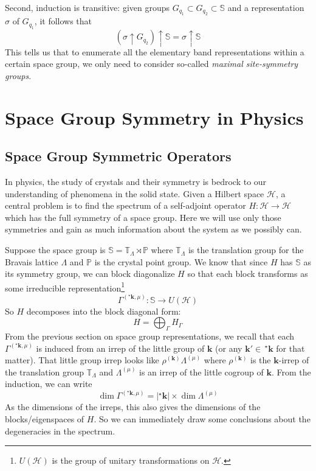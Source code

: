 \documentclass[9 pt]{report}
\def\*#1{\boldsymbol{#1}}
\begin{document}
Second, induction is transitive: given groups $G_{q_1}\subset G_{q_2} \subset \mathbb{S}$ and a representation $\sigma$ of $G_{q_1}$, it follows that
$$ (\sigma \uparrow G_{q_2})\uparrow \mathbb{S} = \sigma \uparrow \mathbb{S}$$
This tells us that to enumerate all the elementary band representations within a certain space group, we only need to consider so-called \emph{maximal site-symmetry groups}.


\chapter*{Space Group Symmetry in Physics}

{\centering
\section*{Space Group Symmetric Operators}}

\noindent In physics, the study of crystals and their symmetry is bedrock to our understanding of phenomena in the solid state. Given a Hilbert space $\mathcal{H}$, a central problem is to find the spectrum of a self-adjoint operator $H:\mathcal{H}\to\mathcal{H}$ which has the full symmetry of a space group. Here we will use only those symmetries and gain as much information about the system as we possibly can.

Suppose the space group is $\mathbb{S}=\mathbb{T}_\Lambda\rtimes\mathbb{P}$ where $\mathbb{T}_\Lambda$ is the translation group for the Bravais lattice $\Lambda$ and $\mathbb{P}$ is the crystal point group. We know that since $H$ has $\mathbb{S}$ as its symmetry group, we can block diagonalize $H$ so that each block transforms as some irreducible representation\footnote{$U(\mathcal{H})$ is the group of unitary transformations on $\mathcal{H}$.} 
$$\Gamma^{(^\star\*k,\mu)}:\mathbb{S}\to U(\mathcal{H})$$
So $H$ decomposes into the block diagonal form:
$$ H = \bigoplus_{\Gamma}H_\Gamma $$
From the previous section on space group representations, we recall that each $\Gamma^{(^\star\*k,\mu)}$ is induced from an irrep of the little group of $\*k$ (or any $\*k'\in\, ^\star\*k$ for that matter). That little group irrep looks like $\rho^{(\*k)}\Lambda^{(\mu)}$ where $\rho^{(\*k)}$ is the $\*k$-irrep of the translation group $\mathbb{T}_\Lambda$ and $\Lambda^{(\mu)}$ is an irrep of the little cogroup of $\*k$. From the induction, we can write
$$\dim\Gamma^{(^\star\*k,\mu)}=|^\star\*k|\times\dim\Lambda^{(\mu)}$$
As the dimensions of the irreps, this also gives the dimensions of the blocks/eigenspaces of  $H$. So we can immediately draw some conclusions about the degeneracies in the spectrum. 
\end{document}
